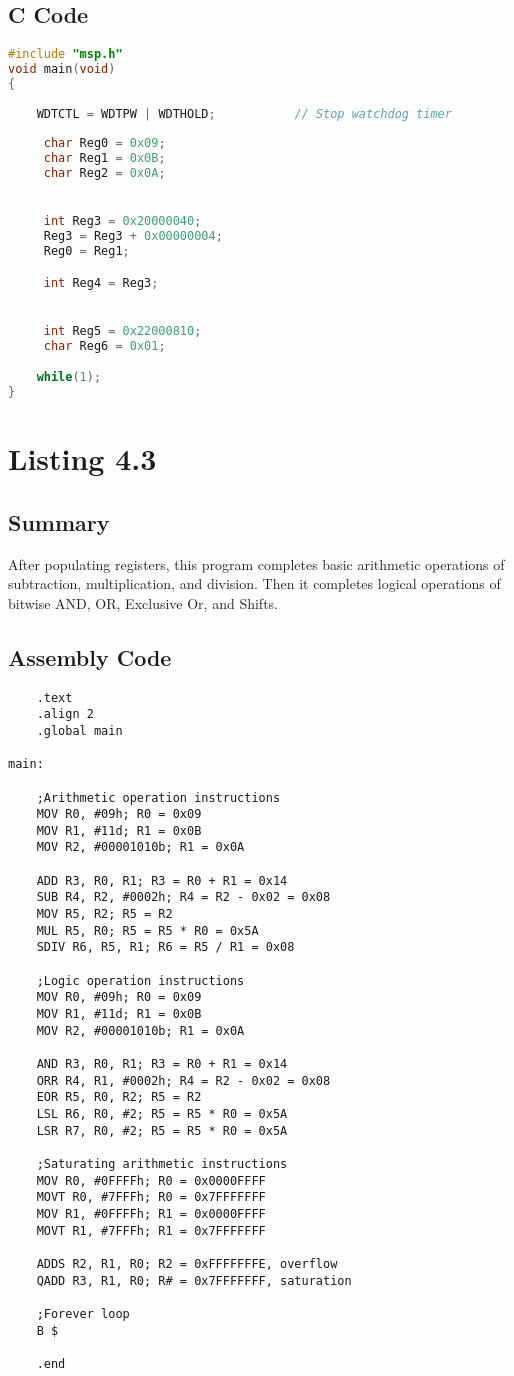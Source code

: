 \documentclass[11pt]{article}
\begin{document}
\subsection{C Code}
\begin{lstlisting}[language = C]
#include "msp.h"
void main(void)
{
	
    WDTCTL = WDTPW | WDTHOLD;           // Stop watchdog timer
	
     char Reg0 = 0x09;
     char Reg1 = 0x0B;
     char Reg2 = 0x0A;


     int Reg3 = 0x20000040;
     Reg3 = Reg3 + 0x00000004;
     Reg0 = Reg1;

     int Reg4 = Reg3;


     int Reg5 = 0x22000810;
     char Reg6 = 0x01;

    while(1);
}
\end{lstlisting}

\section{Listing 4.3}
\subsection{Summary}
After populating registers, this program completes basic arithmetic operations of subtraction, multiplication, and division. Then it completes logical operations of bitwise AND, OR, Exclusive Or, and Shifts.
\subsection{Assembly Code}
\begin{lstlisting}
	.text
	.align 2
	.global main

main:

	;Arithmetic operation instructions
	MOV R0, #09h; R0 = 0x09
	MOV R1, #11d; R1 = 0x0B
	MOV R2, #00001010b; R1 = 0x0A

	ADD R3, R0, R1; R3 = R0 + R1 = 0x14
	SUB R4, R2, #0002h; R4 = R2 - 0x02 = 0x08
	MOV R5, R2; R5 = R2
	MUL R5, R0; R5 = R5 * R0 = 0x5A
	SDIV R6, R5, R1; R6 = R5 / R1 = 0x08

	;Logic operation instructions
	MOV R0, #09h; R0 = 0x09
	MOV R1, #11d; R1 = 0x0B
	MOV R2, #00001010b; R1 = 0x0A

	AND R3, R0, R1; R3 = R0 + R1 = 0x14
	ORR R4, R1, #0002h; R4 = R2 - 0x02 = 0x08
	EOR R5, R0, R2; R5 = R2
	LSL R6, R0, #2; R5 = R5 * R0 = 0x5A
	LSR R7, R0, #2; R5 = R5 * R0 = 0x5A

	;Saturating arithmetic instructions
	MOV R0, #0FFFFh; R0 = 0x0000FFFF
	MOVT R0, #7FFFh; R0 = 0x7FFFFFFF
	MOV R1, #0FFFFh; R1 = 0x0000FFFF
	MOVT R1, #7FFFh; R1 = 0x7FFFFFFF

	ADDS R2, R1, R0; R2 = 0xFFFFFFFE, overflow
	QADD R3, R1, R0; R# = 0x7FFFFFFF, saturation

	;Forever loop
	B $

	.end
\end{lstlisting}
\end{document}
